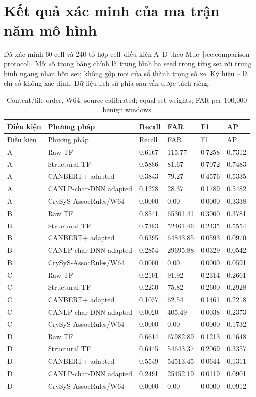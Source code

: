 \documentclass[12pt,a4paper,oneside,openany]{extbook}
\begin{document}
\section{Kết quả xác minh của ma trận năm mô hình}\label{sec:comparison-results}
Đã xác minh 60 cell và 240 tổ hợp cell--điều kiện A--D theo Mục~\ref{sec:comparison-protocol}. Mỗi số trong bảng chính là trung bình ba seed trong từng set rồi trung bình ngang nhau bốn set; không gộp mọi cửa sổ thành trọng số xe. Ký hiệu -- là chỉ số không xác định. Dữ liệu lịch sử phía sau vẫn được tách riêng.
\begin{longtable}{P{1.2cm}P{4.0cm}P{1.7cm}P{2.2cm}P{1.7cm}P{1.7cm}}
\caption{Content/file-order, W64; source-calibrated; equal set weights; FAR per 100,000 benign windows}\label{tab:comparison-main}\\\toprule
Điều kiện & Phương pháp & Recall & FAR & F1 & AP\\\midrule\endfirsthead
\toprule
Điều kiện & Phương pháp & Recall & FAR & F1 & AP\\\midrule\endhead
A & Raw TF & 0.6167 & 115.77 & 0.7258 & 0.7312\\
A & Structural TF & 0.5886 & 81.67 & 0.7072 & 0.7483\\
A & CANBERT+ adapted & 0.3843 & 79.27 & 0.4576 & 0.5335\\
A & CANLP-char-DNN adapted & 0.1228 & 28.37 & 0.1789 & 0.5482\\
A & CrySyS-AssocRules/W64 & 0.0000 & 0.00 & 0.0000 & 0.3338\\
B & Raw TF & 0.8541 & 65301.41 & 0.3000 & 0.3781\\
B & Structural TF & 0.7383 & 52461.46 & 0.2435 & 0.5554\\
B & CANBERT+ adapted & 0.6395 & 64843.85 & 0.0593 & 0.0970\\
B & CANLP-char-DNN adapted & 0.2854 & 29695.88 & 0.0329 & 0.0542\\
B & CrySyS-AssocRules/W64 & 0.0000 & 0.00 & 0.0000 & 0.0591\\
C & Raw TF & 0.2101 & 91.92 & 0.2314 & 0.2661\\
C & Structural TF & 0.2230 & 75.82 & 0.2600 & 0.2928\\
C & CANBERT+ adapted & 0.1037 & 62.54 & 0.1461 & 0.2218\\
C & CANLP-char-DNN adapted & 0.0020 & 405.49 & 0.0038 & 0.2373\\
C & CrySyS-AssocRules/W64 & 0.0000 & 0.00 & 0.0000 & 0.1732\\
D & Raw TF & 0.6614 & 67982.89 & 0.1213 & 0.1648\\
D & Structural TF & 0.6445 & 54643.37 & 0.2069 & 0.3357\\
D & CANBERT+ adapted & 0.5549 & 54513.45 & 0.0644 & 0.1311\\
D & CANLP-char-DNN adapted & 0.2491 & 25452.19 & 0.0119 & 0.0901\\
D & CrySyS-AssocRules/W64 & 0.0000 & 0.00 & 0.0000 & 0.0912\\
\bottomrule\end{longtable}
\end{document}
